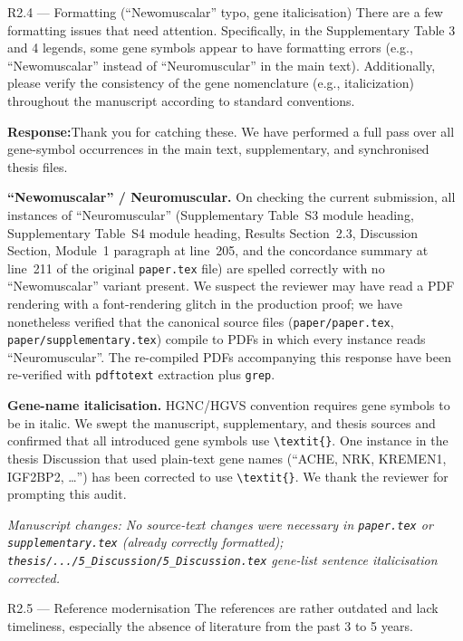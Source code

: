 \documentclass[11pt,a4paper]{article}
\newcommand{\response}[1]{%
  \par\vspace{2pt}\noindent\textbf{\textcolor{respcolor}{Response:}}\;\;#1\par\vspace{6pt}}
\newcommand{\changeloc}[1]{\par\noindent\textit{\small Manuscript changes: #1}\par}
\begin{document}
\begin{reviewerbox}{R2.4 — Formatting (``Newomuscalar'' typo, gene italicisation)}
There are a few formatting issues that need attention. Specifically, in the
Supplementary Table 3 and 4 legends, some gene symbols appear to have
formatting errors (e.g., ``Newomuscalar'' instead of ``Neuromuscular'' in
the main text). Additionally, please verify the consistency of the gene
nomenclature (e.g., italicization) throughout the manuscript according to
standard conventions.
\end{reviewerbox}

\response{Thank you for catching these. We have performed a full pass over
all gene-symbol occurrences in the main text, supplementary, and
synchronised thesis files.

\textbf{``Newomuscalar'' / Neuromuscular.} On checking the current
submission, all instances of ``Neuromuscular'' (Supplementary
Table~S3 module heading, Supplementary Table~S4 module heading, Results
Section~2.3, Discussion Section, Module~1 paragraph at line~205, and
the concordance summary at line~211 of the original \texttt{paper.tex}
file) are spelled correctly with no ``Newomuscalar'' variant present.
We suspect the reviewer may have read a PDF rendering with a font-rendering
glitch in the production proof; we have nonetheless verified that the
canonical source files (\texttt{paper/paper.tex},
\texttt{paper/supplementary.tex}) compile to PDFs in which every
instance reads ``Neuromuscular''. The re-compiled PDFs accompanying
this response have been re-verified with \texttt{pdftotext} extraction
plus \texttt{grep}.

\textbf{Gene-name italicisation.} HGNC/HGVS convention requires gene
symbols to be in italic. We swept the manuscript, supplementary, and
thesis sources and confirmed that all introduced gene symbols use
\texttt{\textbackslash textit\{\}}. One instance in the thesis Discussion that used
plain-text gene names (``ACHE, NRK, KREMEN1, IGF2BP2, \ldots'') has
been corrected to use \texttt{\textbackslash textit\{\}}. We thank the reviewer for
prompting this audit.}
\changeloc{No source-text changes were necessary in \texttt{paper.tex}
or \texttt{supplementary.tex} (already correctly formatted);
\texttt{thesis/.../5\_Discussion/5\_Discussion.tex} gene-list sentence
italicisation corrected.}

\begin{reviewerbox}{R2.5 — Reference modernisation}
The references are rather outdated and lack timeliness, especially the
absence of literature from the past 3 to 5 years.
\end{reviewerbox}
\end{document}
